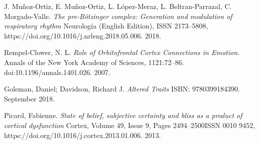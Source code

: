 \documentclass[a4paper, amsfonts, amssymb, amsmath, reprint, showkeys, nofootinbib, twoside]{revtex4-1}
\begin{document}
\begin{thebibliography}{99}
  J. Muñoz-Ortiz, E. Muñoz-Ortiz, L. López-Meraz, L. Beltran-Parrazal,
  C. Morgado-Valle.
  \textit{The pre-Bötzinger complex: Generation and modulation of respiratory rhythm}
  Neurología (English Edition), ISSN 2173–5808,
  https://doi.org/10.1016/j.nrleng.2018.05.006. 2018.

  Rempel-Clower, N. L.
  \textit{Role of Orbitofrontal Cortex Connections in Emotion.}
  Annals of the New York Academy of Sciences,
  1121:72–86. doi:10.1196/annals.1401.026. 2007.

  Goleman, Daniel; Davidson, Richard J.
  \textit{Altered Traits}
  ISBN: 9780399184390. September 2018.

  Picard, Fabienne.
  \textit{State of belief, subjective certainty and bliss as a product of cortical
    dysfunction}
  Cortex, Volume 49, Issue 9, Pages 2494–2500ISSN 0010 9452,
  https://doi.org/10.1016/j.cortex.2013.01.006. 2013.

\end{thebibliography}

% 
\end{document}
